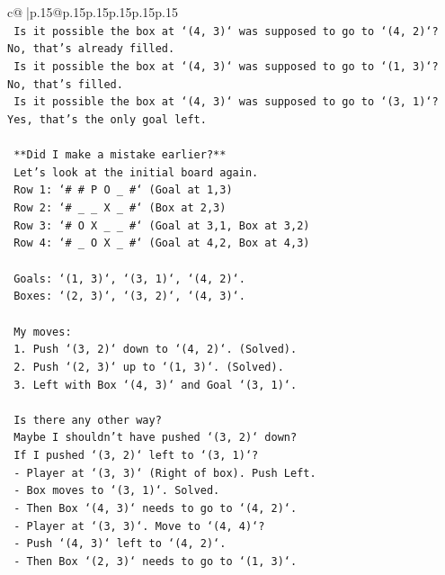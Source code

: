 \documentclass{article}
\begin{document}
{\begin{supertabular}{c@{$\;$}|p{.15\linewidth}@{}p{.15\linewidth}p{.15\linewidth}p{.15\linewidth}p{.15\linewidth}p{.15\linewidth}}
{{{\\ 
\texttt{    Is it possible the box at `(4, 3)` was supposed to go to `(4, 2)`? No, that's already filled.} \\
\texttt{    Is it possible the box at `(4, 3)` was supposed to go to `(1, 3)`? No, that's filled.} \\
\texttt{    Is it possible the box at `(4, 3)` was supposed to go to `(3, 1)`? Yes, that's the only goal left.} \\
\\ 
\texttt{    **Did I make a mistake earlier?**} \\
\texttt{    Let's look at the initial board again.} \\
\texttt{    Row 1: `\# \# P O \_ \#` (Goal at 1,3)} \\
\texttt{    Row 2: `\# \_ \_ X \_ \#` (Box at 2,3)} \\
\texttt{    Row 3: `\# O X \_ \_ \#` (Goal at 3,1, Box at 3,2)} \\
\texttt{    Row 4: `\# \_ O X \_ \#` (Goal at 4,2, Box at 4,3)} \\
\\ 
\texttt{    Goals: `(1, 3)`, `(3, 1)`, `(4, 2)`.} \\
\texttt{    Boxes: `(2, 3)`, `(3, 2)`, `(4, 3)`.} \\
\\ 
\texttt{    My moves:} \\
\texttt{    1. Push `(3, 2)` down to `(4, 2)`. (Solved).} \\
\texttt{    2. Push `(2, 3)` up to `(1, 3)`. (Solved).} \\
\texttt{    3. Left with Box `(4, 3)` and Goal `(3, 1)`.} \\
\\ 
\texttt{    Is there any other way?} \\
\texttt{    Maybe I shouldn't have pushed `(3, 2)` down?} \\
\texttt{    If I pushed `(3, 2)` left to `(3, 1)`?} \\
\texttt{    {-} Player at `(3, 3)` (Right of box). Push Left.} \\
\texttt{    {-} Box moves to `(3, 1)`. Solved.} \\
\texttt{    {-} Then Box `(4, 3)` needs to go to `(4, 2)`.} \\
\texttt{    {-} Player at `(3, 3)`. Move to `(4, 4)`?} \\
\texttt{    {-} Push `(4, 3)` left to `(4, 2)`.} \\
\texttt{    {-} Then Box `(2, 3)` needs to go to `(1, 3)`.} \\
}}}
\end{supertabular}}
\end{document}
